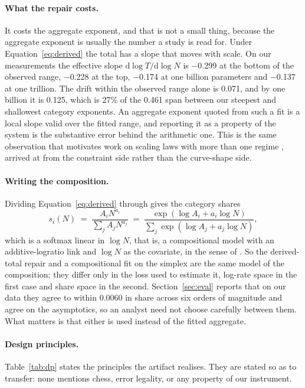 \documentclass[11pt]{article}
\begin{document}
\paragraph{What the repair costs.}
It costs the aggregate exponent, and that is not a small thing, because the
aggregate exponent is usually the number a study is read for. Under
Equation~\ref{eq:derived} the total has a slope that moves with scale. On our
measurements the effective slope $\mathrm{d}\log T/\mathrm{d}\log N$ is
$-$0.299 at the bottom of the observed range, $-$0.228 at
the top, $-$0.174 at one billion parameters and $-$0.137 at one
trillion. The drift within the observed range alone is 0.071, and
by one billion it is 0.125, which is 27\% of the
0.461 span between our steepest and shallowest category exponents. An
aggregate exponent quoted from such a fit is a local slope valid over the fitted
range, and reporting it as a property of the system is the substantive error behind
the arithmetic one. This is the same observation that motivates work on scaling laws
with more than one regime \citep{caballero2023broken}, arrived at from the
constraint side rather than the curve-shape side.

\paragraph{Writing the composition.}
Dividing Equation~\ref{eq:derived} through gives the category shares
\begin{equation}
s_i(N) \;=\; \frac{A_i N^{a_i}}{\sum_j A_j N^{a_j}}
      \;=\; \frac{\exp(\log A_i + a_i \log N)}{\sum_j \exp(\log A_j + a_j \log N)},
\label{eq:softmax}
\end{equation}
which is a softmax linear in $\log N$, that is, a compositional model with an
additive-logratio link and $\log N$ as the covariate, in the sense of
\citet{aitchison1986statistical}. So the derived-total repair and a compositional
fit on the simplex are the same model of the composition; they differ only in the
loss used to estimate it, log-rate space in the first case and share space in the
second. Section~\ref{sec:eval} reports that on our data they agree to within
0.0060 in share across six orders of magnitude and agree on the
asymptotics, so an analyst need not choose carefully between them. What matters is
that either is used instead of the fitted aggregate.

\paragraph{Design principles.}
Table~\ref{tab:dp} states the principles the artifact realises. They are stated so
as to transfer: none mentions chess, error legality, or any property of our
instrument.
\end{document}
